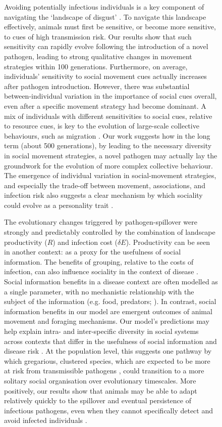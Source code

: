 \begin{figure}[!h]
Avoiding potentially infectious individuals is a key component of navigating the `landscape of disgust' \citep{weinstein2018}.
To navigate this landscape effectively, animals must first be sensitive, or become more sensitive, to cues of high transmission risk.
Our results show that such sensitivity can rapidly evolve following the introduction of a novel pathogen, leading to strong qualitative changes in movement strategies within 100 generations.
Furthermore, on average, individuals' sensitivity to social movement cues actually increases after pathogen introduction.
However, there was substantial between-individual variation in the importance of social cues overall, even after a specific movement strategy had become dominant.
A mix of individuals with different sensitivities to social cues, relative to resource cues, is key to the evolution of large-scale collective behaviours, such as migration \citep{guttal2010}.
Our work suggests how in the long term (about 500 generations), by leading to the necessary diversity in social movement strategies, a novel pathogen may actually lay the groundwork for the evolution of more complex collective behaviour.
The emergence of individual variation in social-movement strategies, and especially the trade-off between movement, associations, and infection risk also suggests a clear mechanism by which sociality could evolve as a personality trait \citep[][]{gartland2021}.

The evolutionary changes triggered by pathogen-spillover were strongly and predictably controlled by the combination of landscape productivity ($R$) and infection cost ($\delta E$).
Productivity can be seen in another context: as a proxy for the usefulness of social information.
The benefits of grouping, relative to the costs of infection, can also influence sociality in the context of disease \citep{almberg2015,ezenwa2016}.
Social information benefits in a disease context are often modelled as a single parameter, with no mechanistic relationship with the subject of the information (e.g. food, predators; \citealt{ashby2021}). 
In contrast, social information benefits in our model are emergent outcomes of animal movement and foraging mechanisms.
Our model's predictions may help explain intra- and inter-specific diversity in social systems across contexts that differ in the usefulness of social information and disease risk \citep{lott1991, sah2018}.
At the population level, this suggests one pathway by which gregarious, clustered species, which are expected to be more at risk from transmissible pathogens \citep{sah2018}, could transition to a more solitary social organisation over evolutionary timescales.
More positively, our results show that animals may be able to adapt relatively quickly to the spillover and eventual persistence of infectious pathogens, even when they cannot specifically detect and avoid infected individuals \citep{stroeymeyt2018}.


\end{figure}
